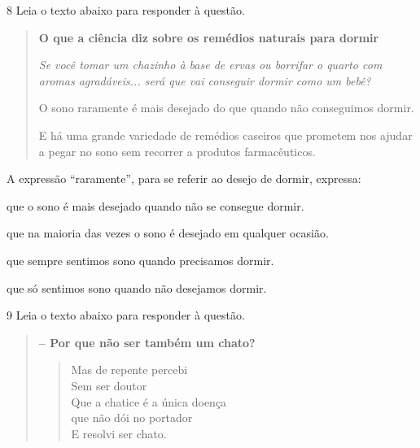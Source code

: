 \num{8} Leia o texto abaixo para responder à questão. 

\begin{quote}

\textbf{O que a ciência diz sobre os remédios naturais para dormir}

\textit{Se você tomar um chazinho à base de ervas ou borrifar o quarto com
aromas agradáveis... será que vai conseguir dormir como um bebê?}

O sono raramente é mais desejado do que quando não conseguimos dormir.

E há uma grande variedade de remédios caseiros que prometem nos ajudar a
pegar no sono sem recorrer a produtos farmacêuticos.

\end{quote}


A expressão ``raramente'', para se referir ao desejo de dormir, expressa:

\begin{escolha}
  
  \item que o sono é mais desejado quando não se consegue dormir.
  
  \item que na maioria das vezes o sono é desejado em qualquer ocasião.
  
  \item que sempre sentimos sono quando precisamos dormir.
  
  \item que só sentimos sono quando não desejamos dormir. 

\end{escolha}

\num{9} Leia o texto abaixo para responder à questão. 

\begin{quote}

\textbf{-- Por que não ser também um chato?}

\begin{verse}

Mas de repente percebi \\
Sem ser doutor \\
Que a chatice é a única doença \\
que não dói no portador \\
E resolvi ser chato. 

\end{verse}
\end{quote}

